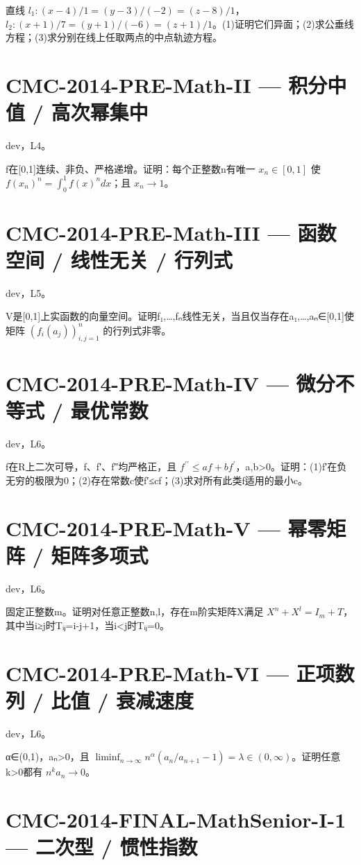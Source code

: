 \documentclass[UTF8]{ctexart}
\begin{document}
直线 $l_1:(x-4)/1=(y-3)/(-2)=(z-8)/1$，$l_2:(x+1)/7=(y+1)/(-6)=(z+1)/1$。(1)证明它们异面；(2)求公垂线方程；(3)求分别在线上任取两点的中点轨迹方程。

\section*{CMC-2014-PRE-Math-II — 积分中值 / 高次幂集中}

dev，L4。

f在[0,1]连续、非负、严格递增。证明：每个正整数n有唯一 $x_n\in[0,1]$ 使 $f(x_n)^n=\int_0^1 f(x)^n dx$；且 $x_n\to1$。

\section*{CMC-2014-PRE-Math-III — 函数空间 / 线性无关 / 行列式}

dev，L5。

V是[0,1]上实函数的向量空间。证明f₁,…,fₙ线性无关，当且仅当存在a₁,…,aₙ∈[0,1]使矩阵 $(f_i(a_j))_{i,j=1}^n$ 的行列式非零。

\section*{CMC-2014-PRE-Math-IV — 微分不等式 / 最优常数}

dev，L6。

f在R上二次可导，f、f′、f″均严格正，且 $f^{\prime\prime}\le af+bf^{\prime}$，a,b>0。证明：(1)f′在负无穷的极限为0；(2)存在常数c使f′≤cf；(3)求对所有此类f适用的最小c。

\section*{CMC-2014-PRE-Math-V — 幂零矩阵 / 矩阵多项式}

dev，L6。

固定正整数m。证明对任意正整数n,l，存在m阶实矩阵X满足 $X^n+X^l=I_m+T$，其中当i≥j时Tᵢⱼ=i-j+1，当i<j时Tᵢⱼ=0。

\section*{CMC-2014-PRE-Math-VI — 正项数列 / 比值 / 衰减速度}

dev，L6。

α∈(0,1)，aₙ>0，且 $\liminf_{n\to\infty}n^\alpha(a_n/a_{n+1}-1)=\lambda\in(0,\infty)$。证明任意k>0都有 $n^ka_n\to0$。

\section*{CMC-2014-FINAL-MathSenior-I-1 — 二次型 / 惯性指数}
\end{document}
